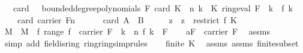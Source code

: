 \begin{isabellebody}
\ \ \ {\isachardoublequoteopen}card\ {\isacharbraceleft}{\kern0pt}{\isasymomega}\ {\isasymin}\ bounded{\isacharunderscore}{\kern0pt}degree{\isacharunderscore}{\kern0pt}polynomials\ F\ {\isacharparenleft}{\kern0pt}card\ K\ {\isacharplus}{\kern0pt}\ n{\isacharparenright}{\kern0pt}{\isachardot}{\kern0pt}\ {\isacharparenleft}{\kern0pt}{\isasymforall}k\ {\isasymin}\ K{\isachardot}{\kern0pt}\ ring{\isachardot}{\kern0pt}eval\ F\ {\isasymomega}\ k\ {\isacharequal}{\kern0pt}\ f\ k{\isacharparenright}{\kern0pt}{\isacharbraceright}{\kern0pt}\ {\isacharequal}{\kern0pt}\ \isanewline
\ \ \ \ card\ {\isacharparenleft}{\kern0pt}carrier\ F{\isacharparenright}{\kern0pt}{\isacharcircum}{\kern0pt}n{\isachardoublequoteclose}\ \isanewline
\ \ \ \ {\isacharparenleft}{\kern0pt}\ {\isachardoublequoteopen}card\ {\isacharquery}{\kern0pt}A\ {\isacharequal}{\kern0pt}\ {\isacharquery}{\kern0pt}B{\isachardoublequoteclose}{\isacharparenright}{\kern0pt}\isanewline
%
\isadelimproof
%
\endisadelimproof
%
\isatagproof
{}\isamarkupfalse%
\ {\isacharminus}{\kern0pt}\isanewline
\ \ \isamarkupfalse%
\ z\ \ {\isachardoublequoteopen}z\ {\isacharequal}{\kern0pt}\ restrict\ f\ K{\isachardoublequoteclose}\isanewline
\ \ \isamarkupfalse%
\ M\ \ {\isachardoublequoteopen}M\ {\isacharequal}{\kern0pt}\ {\isacharbraceleft}{\kern0pt}f{\isachardot}{\kern0pt}\ range\ f\ {\isasymsubseteq}\ carrier\ F\ {\isasymand}\ {\isacharparenleft}{\kern0pt}{\isasymforall}k\ {\isasymge}\ n{\isachardot}{\kern0pt}\ f\ k\ {\isacharequal}{\kern0pt}\ {\isasymzero}\isactrlbsub F\isactrlesub {\isacharparenright}{\kern0pt}{\isacharbraceright}{\kern0pt}{\isachardoublequoteclose}\isanewline
\isanewline
\ \ \isamarkupfalse%
\ a{\isacharcolon}{\kern0pt}{\isachardoublequoteopen}{\isasymzero}\isactrlbsub F\isactrlesub \ {\isasymin}\ carrier\ F{\isachardoublequoteclose}\ \isamarkupfalse%
\ assms{\isacharparenleft}{\kern0pt}{}{\isacharparenright}{\kern0pt}\isanewline
\ \ \ \ \isamarkupfalse%
\ {\isacharparenleft}{\kern0pt}simp\ add{\isacharcolon}{\kern0pt}\ field{\isachardot}{\kern0pt}is{\isacharunderscore}{\kern0pt}ring\ ring{\isachardot}{\kern0pt}ring{\isacharunderscore}{\kern0pt}simprules{\isacharparenleft}{\kern0pt}{}{\isacharparenright}{\kern0pt}{\isacharparenright}{\kern0pt}\isanewline
\isanewline
\ \ \isamarkupfalse%
\ {\isachardoublequoteopen}finite\ K{\isachardoublequoteclose}\ \isamarkupfalse%
\ assms{\isacharparenleft}{\kern0pt}{}{\isacharparenright}{\kern0pt}\ assms{\isacharparenleft}{\kern0pt}{}{\isacharparenright}{\kern0pt}\ finite{\isacharunderscore}{\kern0pt}subset\ \isamarkupfalse%

\end{isabellebody}
